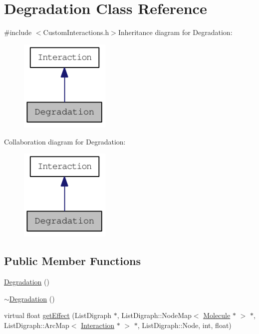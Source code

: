 \hypertarget{classDegradation}{
\section{Degradation Class Reference}
\label{classDegradation}
}


{\ttfamily \#include $<$CustomInteractions.h$>$}Inheritance diagram for Degradation:\nopagebreak
\begin{figure}[H]
\begin{center}
\leavevmode
\includegraphics[width=122pt]{classDegradation__inherit__graph}
\end{center}
\end{figure}
Collaboration diagram for Degradation:\nopagebreak
\begin{figure}[H]
\begin{center}
\leavevmode
\includegraphics[width=122pt]{classDegradation__coll__graph}
\end{center}
\end{figure}
\subsection*{Public Member Functions}
\begin{DoxyCompactItemize}
\item 
\hyperlink{classDegradation_a1a703897347e37fd019c8ad9ff033d17}{Degradation} ()
\item 
\hyperlink{classDegradation_adb12186e524e71c1d633e6ccfb09e322}{$\sim$Degradation} ()
\item 
virtual float \hyperlink{classDegradation_a3cad4fc84026c6f627306a7e35527f3c}{getEffect} (ListDigraph $\ast$, ListDigraph::NodeMap$<$ \hyperlink{classMolecule}{Molecule} $\ast$ $>$ $\ast$, ListDigraph::ArcMap$<$ \hyperlink{classInteraction}{Interaction} $\ast$ $>$ $\ast$, ListDigraph::Node, int, float)
\end{DoxyCompactItemize}


